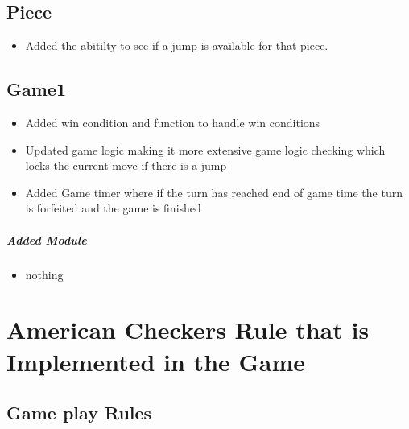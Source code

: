\documentclass[10pt]{article}
\begin{document}
	\subsection{Piece}
	\begin{itemize}
	\item Added the abitilty to see if a jump is available for that piece.
	\end{itemize}
	
	\subsection{Game1}	
	\begin{itemize}
	\item Added win condition and function to handle win conditions
	\item Updated game logic making it more extensive game logic checking which locks the current move if there is a jump
	\item Added Game timer where if the turn has reached end of game time the turn is forfeited and the game is finished
	\end{itemize}	
	
	\subparagraph{Added Module}
	\begin{itemize}
	\item nothing
	\end{itemize}
\newpage
\section{American Checkers Rule that is Implemented in the Game} 
	\subsection{Game play Rules}
\end{document}
